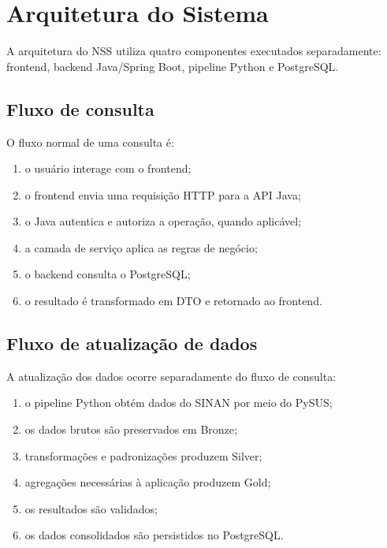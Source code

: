 \section{Arquitetura do Sistema}

A arquitetura do NSS utiliza quatro componentes executados separadamente: frontend, backend Java/Spring Boot, pipeline Python e PostgreSQL.


\subsection{Fluxo de consulta}

O fluxo normal de uma consulta é:

\begin{enumerate}
    \item o usuário interage com o frontend;
    \item o frontend envia uma requisição HTTP para a API Java;
    \item o Java autentica e autoriza a operação, quando aplicável;
    \item a camada de serviço aplica as regras de negócio;
    \item o backend consulta o PostgreSQL;
    \item o resultado é transformado em DTO e retornado ao frontend.
\end{enumerate}

\subsection{Fluxo de atualização de dados}

A atualização dos dados ocorre separadamente do fluxo de consulta:

\begin{enumerate}
    \item o pipeline Python obtém dados do SINAN por meio do PySUS;
    \item os dados brutos são preservados em Bronze;
    \item transformações e padronizações produzem Silver;
    \item agregações necessárias à aplicação produzem Gold;
    \item os resultados são validados;
    \item os dados consolidados são persistidos no PostgreSQL.
\end{enumerate}

